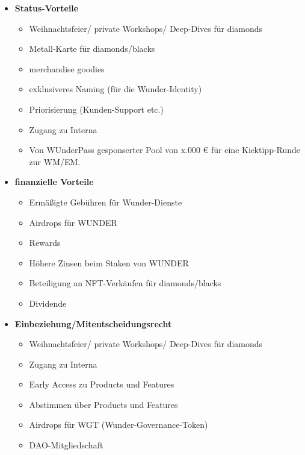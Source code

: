 

\vspace{0.3cm}




\begin{itemize}
	\item \textbf{Status-Vorteile}
	\begin{itemize}
		\item Weihnachtsfeier/ private Workshops/ Deep-Dives für diamonds
		\item Metall-Karte für diamonds/blacks
		\item merchandise goodies
		\item exklusiveres Naming (für die Wunder-Identity)
		\item Priorisierung (Kunden-Support etc.)
		\item Zugang zu Interna
		\item Von WUnderPass gesponserter Pool von x.000 € für eine Kicktipp-Runde zur WM/EM.
	\end{itemize}
	\item \textbf{finanzielle Vorteile}
	\begin{itemize}
		\item Ermäßigte Gebühren für Wunder-Dienste
		\item Airdrops für WUNDER
		\item Rewards
		\item Höhere Zinsen beim Staken von WUNDER
		\item Beteiligung an NFT-Verkäufen für diamonds/blacks
		\item Dividende 
	\end{itemize}
	\item \textbf{Einbeziehung/Mitentscheidungsrecht}
	\begin{itemize}
		\item Weihnachtsfeier/ private Workshops/ Deep-Dives für diamonds
		\item Zugang zu Interna
		\item Early Access zu Products und Features
		\item Abstimmen über Products und Features
		\item Airdrops für WGT (Wunder-Governance-Token)
		\item DAO-Mitgliedschaft
	\end{itemize}
\end{itemize}


\vspace{0.5cm}